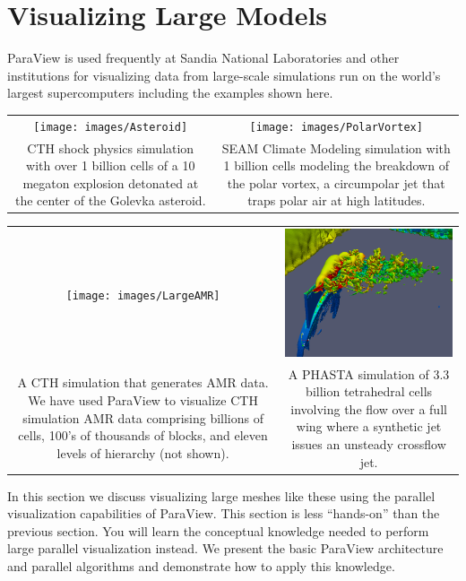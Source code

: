 \chapter{Visualizing Large Models}
\label{chap:VisualizingLargeModels}

ParaView is used frequently at Sandia National Laboratories and other
institutions for visualizing data from large-scale simulations run on the
world's largest supercomputers including the examples shown here.

\begin{inlinefig}
  \begin{tabular}{cc}
    \texttt{[image: images/Asteroid]} &
    \texttt{[image: images/PolarVortex]} \\
    \parbox[t]{0.431\linewidth}{\footnotesize CTH shock physics simulation
      with over 1 billion cells of a 10 megaton explosion detonated at the
      center of the Golevka asteroid.} &
    \parbox[t]{0.469\linewidth}{\footnotesize SEAM Climate Modeling
      simulation with 1 billion cells modeling the breakdown of the polar
      vortex, a circumpolar jet that traps polar air at high latitudes.}
  \end{tabular}

  \begin{tabular}{cc}
    \texttt{[image: images/LargeAMR]} &
    \includegraphics[width=0.426\linewidth]{images/Crossflow} \\
    \parbox[t]{0.474\linewidth}{\footnotesize A CTH simulation that
      generates AMR data.  We have used ParaView to visualize CTH
      simulation AMR data comprising billions of cells, 100's of thousands
      of blocks, and eleven levels of hierarchy (not shown).} &
    \parbox[t]{0.426\linewidth}{\footnotesize A PHASTA simulation of 3.3
      billion tetrahedral cells involving the flow over a full wing where a
    synthetic jet issues an unsteady crossflow jet.}
  \end{tabular}
\end{inlinefig}

In this section we discuss visualizing large meshes like these using the
parallel visualization capabilities of ParaView.  This section is less
``hands-on'' than the previous section.  You will learn the conceptual
knowledge needed to perform large parallel visualization instead.  We
present the basic ParaView architecture and parallel algorithms and
demonstrate how to apply this knowledge.


